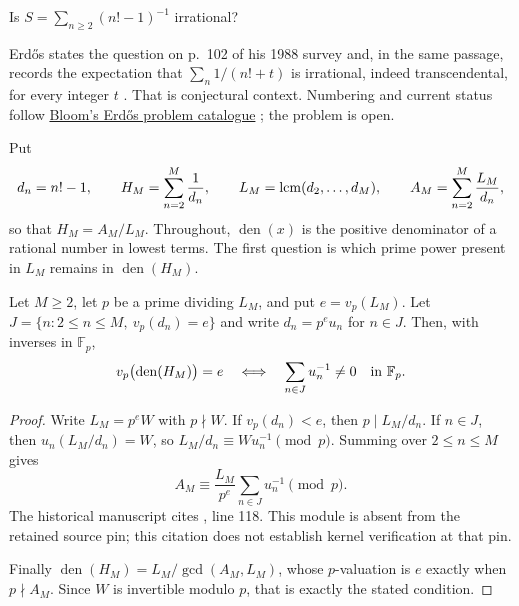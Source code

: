 \documentclass[11pt]{article}
\newcommand{\Ser}{S}
\newcommand{\Lc}{L}
\newcommand{\den}{\operatorname{den}}
\begin{document}
\begin{problem}[Erd\H{o}s \#68]\label{long68:res:problem}
Is $\Ser=\sum_{n\ge2}(n!-1)^{-1}$ irrational?
\end{problem}

\noindent Erd\H{o}s states the question on p.~102 of his 1988 survey and, in
the same passage, records the expectation that $\sum_n1/(n!+t)$ is
irrational, indeed transcendental, for every integer $t$
\cite[p.~102]{erdos1988}.  That is conjectural context.  Numbering and
current status follow \href{https://www.erdosproblems.com/68}{Bloom's
Erd\H{o}s problem catalogue} \cite{bloom}; the problem is open.

Put
\[
 d_n=n!-1,\qquad H_M=\sum_{n=2}^{M}\frac1{d_n},\qquad
 \Lc_M=\lcm(d_2,\ldots,d_M),\qquad
 A_M=\sum_{n=2}^{M}\frac{\Lc_M}{d_n},
\]
so that $H_M=A_M/\Lc_M$.  Throughout, $\den(x)$ is the positive denominator
of a rational number in lowest terms.  The first question is which prime
power present in $\Lc_M$ remains in $\den(H_M)$.

\label{long68:res:lead-prime-pole}
\begin{theorem}\label{long68:res:prime-pole}
Let $M\ge2$, let $p$ be a prime dividing $\Lc_M$, and put $e=v_p(\Lc_M)$.
Let $J=\{n:2\le n\le M,\ v_p(d_n)=e\}$ and write $d_n=p^eu_n$ for $n\in J$.
Then, with inverses in $\mathbb F_p$,
\begin{equation}\label{long68:eq:prime-pole-survival}
 v_p\bigl(\den(H_M)\bigr)=e
 \quad\Longleftrightarrow\quad
 \sum_{n\in J}u_n^{-1}\ne0\quad\hbox{in }\mathbb F_p.
\end{equation}
\end{theorem}

\begin{proof}
Write $\Lc_M=p^eW$ with $p\nmid W$.  If $v_p(d_n)<e$, then $p\mid\Lc_M/d_n$.
If $n\in J$, then $u_n(\Lc_M/d_n)=W$, so $\Lc_M/d_n\equiv Wu_n^{-1}\pmod p$.
Summing over $2\le n\le M$ gives
\begin{equation}\label{long68:eq:prime-pole-residue}
 A_M\equiv \frac{\Lc_M}{p^e}\sum_{n\in J}u_n^{-1}\pmod p.
\end{equation}
  The historical manuscript cites , line 118. This module is absent from the retained source pin; this citation does not establish kernel verification at that pin.

Finally $\den(H_M)=\Lc_M/\gcd(A_M,\Lc_M)$, whose $p$-valuation is $e$ exactly
when $p\nmid A_M$.  Since $W$ is invertible modulo $p$, that is exactly the
stated condition.
\end{proof}
\end{document}
